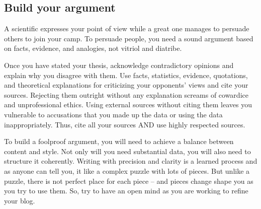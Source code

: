 \documentclass{tufte-handout}\usepackage[]{graphicx}\usepackage[]{color}
\begin{document}



\subsection{Build your argument}

A scientific expresses your point of view while a great one manages to persuade others to join your camp. To persuade people, you need a sound argument based on facts, evidence, and analogies, not vitriol and diatribe. 

Once you have stated your thesis, acknowledge contradictory opinions and explain why you disagree with them. Use facts, statistics, evidence, quotations, and theoretical explanations for criticizing your opponents' views and cite your sources. Rejecting them outright without any explanation screams of cowardice and unprofessional ethics. Using external sources without citing them leaves you vulnerable to accusations that you made up the data or using the data inappropriately. Thus, cite all your sources AND use highly respected sources.

To build a foolproof argument, you will need to achieve a balance between content and style. Not only will you need substantial data, you will also need to structure it coherently. Writing with precision and clarity is a learned process and as anyone can tell you, it like a complex puzzle with lots of pieces. But unlike a puzzle, there is not perfect place for each piece -- and pieces change shape you as you try to use them. So, try to have an open mind as you are working to refine your blog. 
\end{document}
